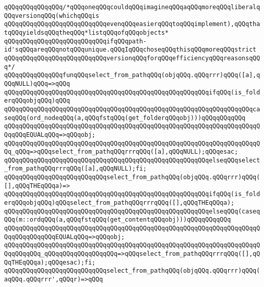 \newline
\verb|qQQqqQQqqQQqqQQq/*qQQqoneqQQqcouldqQQqimagineqQQqaqQQqmoreqQQqliberalqQQqversionqQQq(whichqQQqis|\newline
\verb|qQQqqQQqqQQqqQQqqQQqqQQqqQQqevenqQQqeasierqQQqtoqQQqimplement),qQQqthatqQQqyieldsqQQqtheqQQq*listqQQqofqQQqobjects*|\newline
\verb|qQQqqQQqqQQqqQQqqQQqqQQqqQQqifqQQqpath-id'sqQQqareqQQqnotqQQqunique.qQQqIqQQqchoseqQQqthisqQQqmoreqQQqstrict|\newline
\verb|qQQqqQQqqQQqqQQqqQQqqQQqqQQqversionqQQqforqQQqefficiencyqQQqreasonsqQQq*/|\newline
\verb|qQQqqQQqqQQqqQQqfunqQQqselect_from_pathqQQq(objqQQq.qQQqrrr)qQQq([a],qQQqNULL)qQQq=>qQQq|\newline
\verb|qQQqqQQqqQQqqQQqqQQqqQQqqQQqqQQqqQQqqQQqqQQqqQQqqQQqqQQqifqQQq(is_folderqQQqobjqQQq)qQQq|\newline
\verb|qQQqqQQqqQQqqQQqqQQqqQQqqQQqqQQqqQQqqQQqqQQqqQQqqQQqqQQqqQQqqQQqqQQqcaseqQQq(ord_nodeqQQq(a,qQQqfstqQQq(get_folderqQQqobj)))qQQqqQQqqQQq|\newline
\verb|qQQqqQQqqQQqqQQqqQQqqQQqqQQqqQQqqQQqqQQqqQQqqQQqqQQqqQQqqQQqqQQqqQQqqQQqqQQqEQUALqQQq=>qQQqobj;|\newline
\verb|qQQqqQQqqQQqqQQqqQQqqQQqqQQqqQQqqQQqqQQqqQQqqQQqqQQqqQQqqQQqqQQqqQQqqQQq_qQQq=>qQQqselect_from_pathqQQqrrrqQQq([a],qQQqNULL);qQQqesac;|\newline
\verb|qQQqqQQqqQQqqQQqqQQqqQQqqQQqqQQqqQQqqQQqqQQqqQQqqQQqqQQqelseqQQqselect_from_pathqQQqrrrqQQq([a],qQQqNULL);fi;|\newline
\verb|qQQqqQQqqQQqqQQqqQQqqQQqqQQqselect_from_pathqQQq(objqQQq.qQQqrrr)qQQq([],qQQqTHEqQQqa)=>|\newline
\verb|qQQqqQQqqQQqqQQqqQQqqQQqqQQqqQQqqQQqqQQqqQQqqQQqqQQqqQQqifqQQq(is_folderqQQqobjqQQq)qQQqselect_from_pathqQQqrrrqQQq([],qQQqTHEqQQqa);|\newline
\verb|qQQqqQQqqQQqqQQqqQQqqQQqqQQqqQQqqQQqqQQqqQQqqQQqqQQqqQQqelseqQQq(caseqQQq(m::ordqQQq(a,qQQqfstqQQq(get_contentqQQqobj)))qQQqqQQqqQQq|\newline
\verb|qQQqqQQqqQQqqQQqqQQqqQQqqQQqqQQqqQQqqQQqqQQqqQQqqQQqqQQqqQQqqQQqqQQqqQQqqQQqqQQqqQQqEQUALqQQq=>qQQqobj;|\newline
\verb|qQQqqQQqqQQqqQQqqQQqqQQqqQQqqQQqqQQqqQQqqQQqqQQqqQQqqQQqqQQqqQQqqQQqqQQqqQQqqQQq_qQQqqQQqqQQqqQQqqQQq=>qQQqselect_from_pathqQQqrrrqQQq([],qQQqTHEqQQqa);qQQqesac);fi;|\newline
\verb|qQQqqQQqqQQqqQQqqQQqqQQqqQQqselect_from_pathqQQq(objqQQq.qQQqrrr)qQQq(aqQQq.qQQqrrr',qQQqr)=>qQQq|\newline
